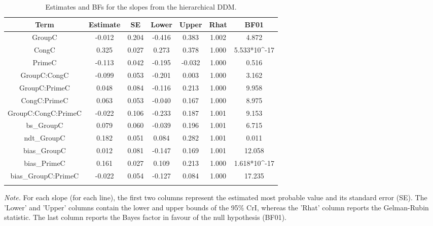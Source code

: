 \documentclass[
  11pt,
  english,
  ,doc,floatsintext]{apa6}
\begin{document}
\begin{table}[htb]

\begin{center}
\begin{threeparttable}

\caption{\label{tab:summary}Estimates and BFs for the slopes from the hierarchical DDM.}

\begin{tabular}{ccccccc}
\toprule
Term & \multicolumn{1}{c}{Estimate} & \multicolumn{1}{c}{SE} & \multicolumn{1}{c}{Lower} & \multicolumn{1}{c}{Upper} & \multicolumn{1}{c}{Rhat} & \multicolumn{1}{c}{BF01}\\
\midrule
GroupC & -0.012 & 0.204 & -0.416 & 0.383 & 1.002 & 4.872\\
CongC & 0.325 & 0.027 & 0.273 & 0.378 & 1.000 & 5.533*10\textasciicircum{}-17\\
PrimeC & -0.113 & 0.042 & -0.195 & -0.032 & 1.000 & 0.516\\
GroupC:CongC & -0.099 & 0.053 & -0.201 & 0.003 & 1.000 & 3.162\\
GroupC:PrimeC & 0.048 & 0.084 & -0.116 & 0.213 & 1.000 & 9.958\\
CongC:PrimeC & 0.063 & 0.053 & -0.040 & 0.167 & 1.000 & 8.975\\
GroupC:CongC:PrimeC & -0.022 & 0.106 & -0.233 & 0.187 & 1.001 & 9.153\\
bs\_GroupC & 0.079 & 0.060 & -0.039 & 0.196 & 1.001 & 6.715\\
ndt\_GroupC & 0.182 & 0.051 & 0.084 & 0.282 & 1.001 & 0.011\\
bias\_GroupC & 0.012 & 0.081 & -0.147 & 0.169 & 1.001 & 12.058\\
bias\_PrimeC & 0.161 & 0.027 & 0.109 & 0.213 & 1.000 & 1.618*10\textasciicircum{}-17\\
bias\_GroupC:PrimeC & -0.022 & 0.054 & -0.127 & 0.084 & 1.000 & 17.235\\
\bottomrule
\addlinespace
\end{tabular}

\begin{tablenotes}[para]
\normalsize{\textit{Note.} For each slope (for each line), the first two columns represent the estimated
    most probable value and its standard error (SE). The 'Lower' and 'Upper' columns
    contain the lower and upper bounds of the 95\% CrI, whereas the 'Rhat' column reports
    the Gelman-Rubin statistic. The last column reports the Bayes factor in favour of the
    null hypothesis (BF01).}
\end{tablenotes}

\end{threeparttable}
\end{center}

\end{table}
\end{document}

